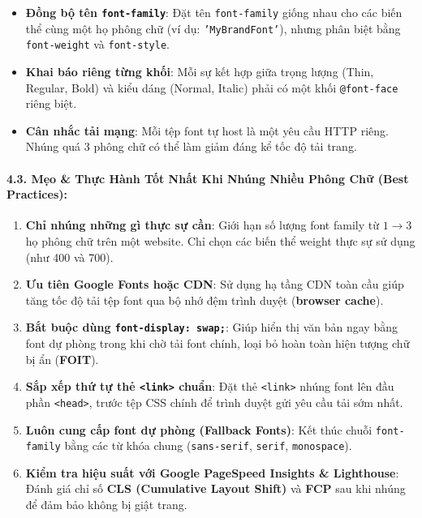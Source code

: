 \documentclass[11pt,oneside]{book}
\newcommand{\codeinline}[1]{\textcolor{accentOrange}{\texttt{#1}}}
\newcommand{\term}[1]{\textbf{\textcolor{primaryBlue}{#1}}}
\begin{document}
\begin{warnBox}
\begin{itemize}[leftmargin=1.5em, itemsep=3pt, parsep=0pt]
    \item \textbf{Đồng bộ tên \codeinline{font-family}}: Đặt tên \codeinline{font-family} giống nhau cho các biến thể cùng một họ phông chữ (ví dụ: \codeinline{'MyBrandFont'}), nhưng phân biệt bằng \codeinline{font-weight} và \codeinline{font-style}.
    \item \textbf{Khai báo riêng từng khối}: Mỗi sự kết hợp giữa trọng lượng (Thin, Regular, Bold) và kiểu dáng (Normal, Italic) phải có một khối \codeinline{@font-face} riêng biệt.
    \item \textbf{Cân nhắc tải mạng}: Mỗi tệp font tự host là một yêu cầu HTTP riêng. Nhúng quá 3 phông chữ có thể làm giảm đáng kể tốc độ tải trang.
\end{itemize}
\end{warnBox}

\paragraph{4.3. Mẹo \& Thực Hành Tốt Nhất Khi Nhúng Nhiều Phông Chữ (Best Practices):}

\begin{tipBox}
\begin{enumerate}[leftmargin=1.5em, itemsep=3pt, parsep=0pt]
    \item \textbf{Chỉ nhúng những gì thực sự cần}: Giới hạn số lượng font family từ $1 \rightarrow 3$ họ phông chữ trên một website. Chỉ chọn các biến thể weight thực sự sử dụng (như 400 và 700).
    \item \textbf{Ưu tiên Google Fonts hoặc CDN}: Sử dụng hạ tầng CDN toàn cầu giúp tăng tốc độ tải tệp font qua bộ nhớ đệm trình duyệt (\term{browser cache}).
    \item \textbf{Bắt buộc dùng \codeinline{font-display: swap;}}: Giúp hiển thị văn bản ngay bằng font dự phòng trong khi chờ tải font chính, loại bỏ hoàn toàn hiện tượng chữ bị ẩn (\term{FOIT}).
    \item \textbf{Sắp xếp thứ tự thẻ \codeinline{<link>} chuẩn}: Đặt thẻ \codeinline{<link>} nhúng font lên đầu phần \codeinline{<head>}, trước tệp CSS chính để trình duyệt gửi yêu cầu tải sớm nhất.
    \item \textbf{Luôn cung cấp font dự phòng (Fallback Fonts)}: Kết thúc chuỗi \codeinline{font-family} bằng các từ khóa chung (\codeinline{sans-serif}, \codeinline{serif}, \codeinline{monospace}).
    \item \textbf{Kiểm tra hiệu suất với Google PageSpeed Insights \& Lighthouse}: Đánh giá chỉ số \term{CLS (Cumulative Layout Shift)} và \term{FCP} sau khi nhúng để đảm bảo không bị giật trang.
\end{enumerate}
\end{tipBox}
\end{document}
